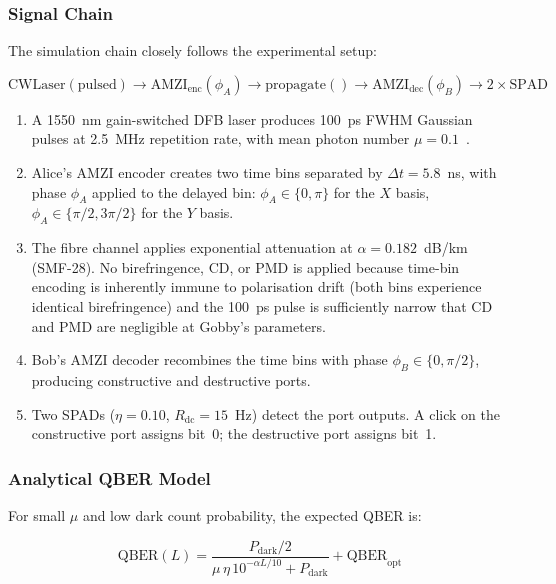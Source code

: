 \documentclass[11pt,a4paper]{article}
\begin{document}
\subsubsection{Signal Chain}

The simulation chain closely follows the experimental setup:

\begin{equation}
  \text{CWLaser}(\text{pulsed}) \to \text{AMZI}_{\text{enc}}(\phi_A)
  \to \text{propagate}() \to \text{AMZI}_{\text{dec}}(\phi_B)
  \to 2\times\text{SPAD}
\end{equation}

\begin{enumerate}[nosep]
  \item A 1550~nm gain-switched DFB laser produces 100~ps FWHM Gaussian
    pulses at 2.5~MHz repetition rate, with mean photon number
    $\mu = 0.1$~\cite{gobby}.
  \item Alice's AMZI encoder creates two time bins separated by
    $\Delta t = 5.8$~ns, with phase $\phi_A$ applied to the delayed
    bin: $\phi_A \in \{0,\pi\}$ for the $X$ basis,
    $\phi_A \in \{\pi/2,3\pi/2\}$ for the $Y$ basis.
  \item The fibre channel applies exponential attenuation at
    $\alpha = 0.182$~dB/km (SMF-28).  No birefringence, CD, or PMD
    is applied because time-bin encoding is inherently immune to
    polarisation drift (both bins experience identical birefringence)
    and the 100~ps pulse is sufficiently narrow that CD and PMD
    are negligible at Gobby's parameters.
  \item Bob's AMZI decoder recombines the time bins with phase
    $\phi_B \in \{0,\pi/2\}$, producing constructive and destructive
    ports.
  \item Two SPADs ($\eta = 0.10$, $R_{\text{dc}} = 15$~Hz) detect
    the port outputs.  A click on the constructive port assigns
    bit~0; the destructive port assigns bit~1.
\end{enumerate}

\subsubsection{Analytical QBER Model}

For small $\mu$ and low dark count probability, the expected QBER is:

\begin{equation}
  \text{QBER}(L) = \frac{P_{\text{dark}}/2}
    {\mu\,\eta\,10^{-\alpha L/10} + P_{\text{dark}}}
    + \text{QBER}_{\text{opt}}
\end{equation}
\end{document}
